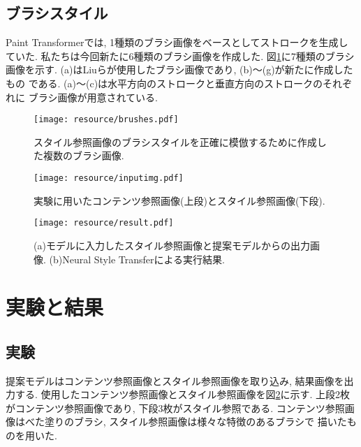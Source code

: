\documentclass[MIRU,submit,uplatex]{miru2023j}
\begin{document}
\subsection{ブラシスタイル}
Paint Transformerでは, 1種類のブラシ画像をベースとしてストロークを生成していた.
私たちは今回新たに6種類のブラシ画像を作成した. 図\ref{fig:brushes}に7種類のブラシ
画像を示す. (a)はLiuらが使用したブラシ画像であり, (b)～(g)が新たに作成したもの
である. (a)～(c)は水平方向のストロークと垂直方向のストロークのそれぞれに
ブラシ画像が用意されている. 
\begin{figure}
    \centering
    \texttt{[image: resource/brushes.pdf]}
    \caption{スタイル参照画像のブラシスタイルを正確に模倣するために作成した複数のブラシ画像.}
    \label{fig:brushes}
\end{figure}


\begin{figure}[t]
    \centering
    \texttt{[image: resource/inputimg.pdf]}
    \caption{実験に用いたコンテンツ参照画像(上段)とスタイル参照画像(下段).}
    \label{fig:inputs}
\end{figure}

\begin{figure*}[t]
    \centering
    \texttt{[image: resource/result.pdf]}
    \caption{(a)モデルに入力したスタイル参照画像と提案モデルからの出力画像.
    (b)Neural Style Transferによる実行結果.}
    \label{fig:result}
\end{figure*}

\section{実験と結果}

\subsection{実験}
提案モデルはコンテンツ参照画像とスタイル参照画像を取り込み, 結果画像を出力する.
使用したコンテンツ参照画像とスタイル参照画像を図\ref{fig:inputs}に示す.
上段2枚がコンテンツ参照画像であり, 下段3枚がスタイル参照である.
コンテンツ参照画像はべた塗りのブラシ, スタイル参照画像は様々な特徴のあるブラシで
描いたものを用いた.
\end{document}
